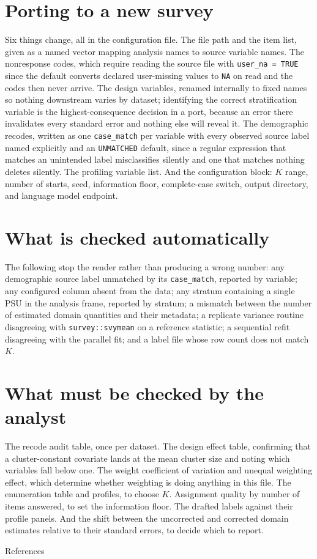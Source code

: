 \documentclass[
  12pt]{article}
\begin{document}
\section{Porting to a new survey}\label{porting-to-a-new-survey}

Six things change, all in the configuration file. The file path and the
item list, given as a named vector mapping analysis names to source
variable names. The nonresponse codes, which require reading the source
file with \texttt{user\_na\ =\ TRUE} since the default converts declared
user-missing values to \texttt{NA} on read and the codes then never
arrive. The design variables, renamed internally to fixed names so
nothing downstream varies by dataset; identifying the correct
stratification variable is the highest-consequence decision in a port,
because an error there invalidates every standard error and nothing else
will reveal it. The demographic recodes, written as one
\texttt{case\_match} per variable with every observed source label named
explicitly and an \texttt{UNMATCHED} default, since a regular expression
that matches an unintended label misclassifies silently and one that
matches nothing deletes silently. The profiling variable list. And the
configuration block: \(K\) range, number of starts, seed, information
floor, complete-case switch, output directory, and language model
endpoint.

\section{What is checked
automatically}\label{what-is-checked-automatically}

The following stop the render rather than producing a wrong number: any
demographic source label unmatched by its \texttt{case\_match}, reported
by variable; any configured column absent from the data; any stratum
containing a single PSU in the analysis frame, reported by stratum; a
mismatch between the number of estimated domain quantities and their
metadata; a replicate variance routine disagreeing with
\texttt{survey::svymean} on a reference statistic; a sequential refit
disagreeing with the parallel fit; and a label file whose row count does
not match \(K\).

\section{What must be checked by the
analyst}\label{what-must-be-checked-by-the-analyst}

The recode audit table, once per dataset. The design effect table,
confirming that a cluster-constant covariate lands at the mean cluster
size and noting which variables fall below one. The weight coefficient
of variation and unequal weighting effect, which determine whether
weighting is doing anything in this file. The enumeration table and
profiles, to choose \(K\). Assignment quality by number of items
answered, to set the information floor. The drafted labels against their
profile panels. And the shift between the uncorrected and corrected
domain estimates relative to their standard errors, to decide which to
report.

References

\renewcommand{\bibsection}{}

\end{document}

